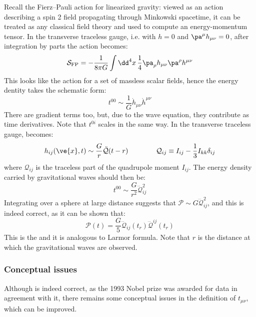 Recall the Fierz--Pauli action  for linearized gravity: viewed as an action describing a spin 2 field propagating through Minkowski spacetime, it can be treated as any classical field theory and used to compute an energy-momentum tensor. In the transverse traceless gauge, i.e. with $ h = 0 $ and $ \pa^\mu h_{\mu \nu} = 0 $, after integration by parts the action becomes:
\begin{equation*}
  \mathcal{S}_{\text{FP}} = - \frac{1}{8\pi G} \int \dd^4 x\, \frac{1}{4} \pa_\rho h_{\mu \nu} \pa^\rho h^{\mu \nu}
\end{equation*}
This looks like the action for a set of massless scalar fields, hence the energy dentity takes the schematic form:
\begin{equation*}
  t^{00} \sim \frac{1}{G} \dot{h}_{\mu \nu} \dot{h}^{\mu \nu}
\end{equation*}
There are gradient terms too, but, due to the wave equation, they contribute as time derivatives. Note that $ t^{0i} $ scales in the same way. In the transverse traceless gauge,  becomes:
\begin{equation*}
  h_{ij}(\ve{x},t) \sim \frac{G}{r} \ddot{\mathcal{Q}}(t - r)
  \qquad \qquad
  \mathcal{Q}_{ij} \equiv I_{ij} - \frac{1}{3} I_{kk} \delta_{ij}
\end{equation*}
where $ \mathcal{Q}_{ij} $ is the traceless part of the quadrupole moment $ I_{ij} $. The energy density carried by gravitational waves should then be:
\begin{equation*}
  t^{00} \sim \frac{G}{r^2} \dddot{\mathcal{Q}}_{ij}^2
\end{equation*}
Integrating over a sphere at large distance suggests that $ \mathcal{P} \sim G \dddot{\mathcal{Q}}_{ij}^2 $, and this is indeed correct, as it can be shown that:
\begin{equation}
  \mathcal{P}(t) = \frac{G}{5} \dddot{\mathcal{Q}}_{ij}(t_r) \dddot{\mathcal{Q}}^{ij}(t_r)
  \label{eq:quadrupole-formula}
\end{equation}
This is the  and it is analogous to Larmor formula. Note that $ r $ is the distance at which the gravitational waves are observed.

\subsubsection{Conceptual issues}

Although  is indeed correct, as the 1993 Nobel prize was awarded for data in agreement with it, there remains some conceptual issues in the definition of $ t_{\mu \nu} $, which can be improved.

